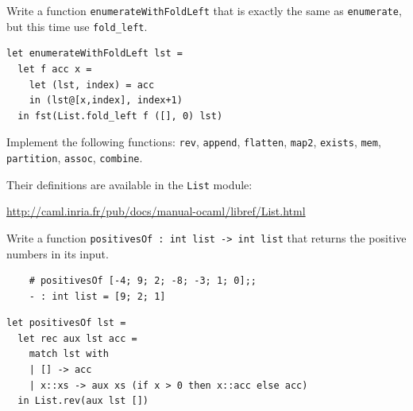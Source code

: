 \documentclass[addpoints]{exam}
\begin{document}
\begin{questions}
  
  \question 
  Write a function \texttt{enumerateWithFoldLeft}
  that is exactly the same as \texttt{enumerate},
  but this time use \texttt{fold\_left}.

  \begin{solutionbox}{3.5cm}
    \begin{verbatim}
let enumerateWithFoldLeft lst =
  let f acc x =
    let (lst, index) = acc
    in (lst@[x,index], index+1)
  in fst(List.fold_left f ([], 0) lst)         
    \end{verbatim}
  \end{solutionbox}

  
  \vspace{2em}
  \vspace{1em}

  \question 
  Implement the following functions:
  \texttt{rev}, \texttt{append}, \texttt{flatten},
  \texttt{map2}, \texttt{exists}, \texttt{mem},
  \texttt{partition}, \texttt{assoc}, \texttt{combine}.

  
  Their definitions are available in the \texttt{List} module:

  \url{http://caml.inria.fr/pub/docs/manual-ocaml/libref/List.html}


  \vspace{2em}
  \vspace{1em}

  \question
  Write a function \texttt{positivesOf : int list -> int list}
  that returns the positive numbers in its input.
  \begin{verbatim}
    # positivesOf [-4; 9; 2; -8; -3; 1; 0];;
    - : int list = [9; 2; 1]
  \end{verbatim}

  \begin{solutionbox}{4cm}
    \begin{verbatim}
let positivesOf lst =
  let rec aux lst acc =
    match lst with
    | [] -> acc
    | x::xs -> aux xs (if x > 0 then x::acc else acc)
  in List.rev(aux lst [])
    \end{verbatim}
  \end{solutionbox}


\end{questions}
\end{document}
